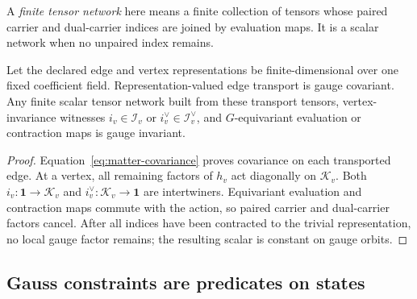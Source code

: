 A \emph{finite tensor network} here means a finite collection of tensors whose
paired carrier and dual-carrier indices are joined by evaluation maps.  It is
a scalar network when no unpaired index remains.

\begin{proposition}
\label{prop:matter-transport}
Let the declared edge and vertex representations be finite-dimensional over
one fixed coefficient field.  Representation-valued edge transport is gauge
covariant.  Any finite scalar
tensor network built from these transport tensors, vertex-invariance witnesses
$i_v\in\mathcal I_v$ or $i_v^{\vee}\in\mathcal I_v^{\vee}$, and $G$-equivariant
evaluation or contraction maps is
gauge invariant.
\end{proposition}

\begin{proof}
Equation~\eqref{eq:matter-covariance} proves covariance on each transported
edge.  At a vertex, all remaining factors of $h_v$ act diagonally on
$\mathcal K_v$.  Both $i_v:\mathbf1\to\mathcal K_v$ and
$i_v^{\vee}:\mathcal K_v\to\mathbf1$ are intertwiners.  Equivariant evaluation
and contraction maps commute with the action, so paired carrier and
dual-carrier factors cancel.  After all indices have been contracted to the trivial
representation, no local gauge factor remains; the resulting scalar is
constant on gauge orbits.
\end{proof}

\subsection{Gauss constraints are predicates on states}

